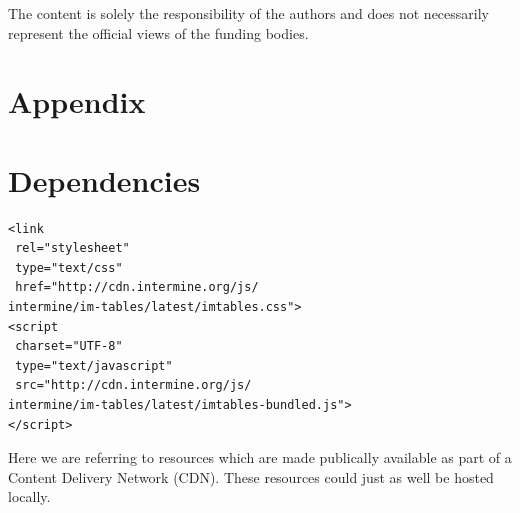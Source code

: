 \documentclass[10pt,a4paper,twocolumn]{article}
\begin{document}
The content is solely the responsibility of the authors and does not necessarily
represent the official views of the funding bodies.

\nocite{*}
{\small
}

\section*{Appendix}
\appendix
\section{Dependencies} \label{sec:deps}

\lstset{language=HTML}

\begin{lstlisting}
<link
 rel="stylesheet"
 type="text/css"
 href="http://cdn.intermine.org/js/
intermine/im-tables/latest/imtables.css">
<script
 charset="UTF-8"
 type="text/javascript"
 src="http://cdn.intermine.org/js/
intermine/im-tables/latest/imtables-bundled.js">
</script>
\end{lstlisting}

Here we are referring to resources which are made publically available
as part of a Content Delivery Network (CDN). These resources could just
as well be hosted locally.
\end{document}
